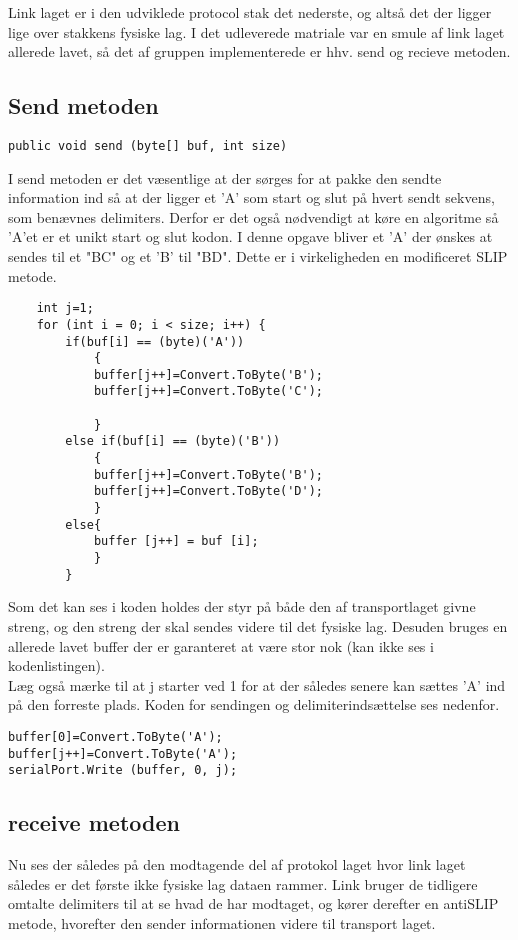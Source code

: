 Link laget er i den udviklede protocol stak det nederste, og altså det der ligger lige over stakkens fysiske lag. I det udleverede matriale var en smule af link laget allerede lavet, så det af gruppen implementerede er hhv. send og recieve metoden.

\subsection{Send metoden}

\begin{verbatim}
public void send (byte[] buf, int size)
\end{verbatim}

I send metoden er det væsentlige at der sørges for at pakke den sendte information ind så at der ligger et 'A' som start og slut på hvert sendt sekvens, som benævnes delimiters.  Derfor er det også nødvendigt at køre en algoritme så 'A'et er et unikt start og slut kodon. I denne opgave bliver et 'A' der ønskes at sendes til et "BC" og et 'B' til "BD". Dette er i virkeligheden en modificeret SLIP metode.


\begin{lstlisting}
	int j=1;
	for (int i = 0; i < size; i++) {
		if(buf[i] == (byte)('A'))
			{
			buffer[j++]=Convert.ToByte('B');
			buffer[j++]=Convert.ToByte('C');

			}
		else if(buf[i] == (byte)('B'))
			{
			buffer[j++]=Convert.ToByte('B');
			buffer[j++]=Convert.ToByte('D');
			}
		else{
			buffer [j++] = buf [i];
			}
		}
\end{lstlisting}

Som det kan ses i koden holdes der styr på både den af transportlaget givne streng, og den streng der skal sendes videre til det fysiske lag. Desuden bruges en allerede lavet buffer der er garanteret at være stor nok (kan ikke ses i kodenlistingen).\\

\noindent Læg også mærke til at j starter ved 1 for at der således senere kan sættes 'A' ind på den forreste plads. Koden for sendingen og delimiterindsættelse ses nedenfor.

\begin{verbatim}
buffer[0]=Convert.ToByte('A');
buffer[j++]=Convert.ToByte('A');
serialPort.Write (buffer, 0, j);
\end{verbatim}

\subsection{receive metoden}
Nu ses der således på den modtagende del af protokol laget hvor link laget således er det første ikke fysiske lag dataen rammer. Link bruger de tidligere omtalte delimiters til at se hvad de har modtaget, og kører derefter en antiSLIP metode, hvorefter den sender informationen videre til transport laget. 
